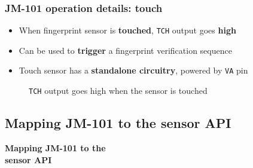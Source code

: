 \documentclass[handout]{beamer}
\begin{document}
\begin{frame}
  \frametitle{JM-101 operation details: touch}

  \begin{itemize}
    \item When fingerprint sensor is \textbf{touched}, \texttt{TCH} output
          goes \textbf{high}
    \item Can be used to \textbf{trigger} a fingerprint verification sequence
    \item Touch sensor has a \textbf{standalone circuitry}, powered by
          \texttt{VA} pin
  \end{itemize}

  \begin{figure}
    \centering
    \caption{\texttt{TCH} output goes high when the sensor is touched}
  \end{figure}
\end{frame}

\subsection{Mapping JM-101 to the sensor API}

\begin{frame}
  \begin{center}
    \Large \textbf{Mapping JM-101 to the\\sensor API}
  \end{center}
\end{frame}
\end{document}

